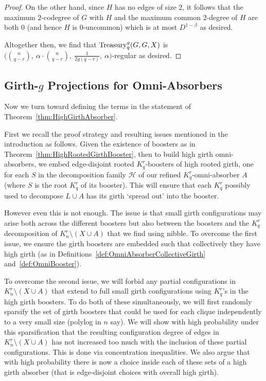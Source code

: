 \documentclass[11pt]{article}
\newcounter{i}
\theoremstyle{plain}
\theoremstyle{plain} %
\theoremstyle{definition}
\begin{document}
\begin{proof}
On the other hand, since $H$ has no edges of size $2$, it follows that the maximum $2$-codegree of $G$ with $H$ and the maximum common $2$-degree of $H$ are both $0$ (and hence $H$ is $0$-uncommon) which is at most $D^{1-\beta}$ as desired.

Altogether then, we find that ${\rm Treasury}_q^g(G,G,X)$ is $\bigg(\binom{n}{q-r},~\alpha\cdot \binom{n}{q-r},~\frac{1}{2g(q-r)},~\alpha\bigg)$-regular as desired.
\end{proof}

\subsection{Girth-$g$ Projections for Omni-Absorbers}\label{ss:OmniProjection}

Now we turn toward defining the terms in the statement of Theorem~\ref{thm:HighGirthAbsorber}.

First we recall the proof strategy and resulting issues mentioned in the introduction as follows. Given the existence of boosters as in Theorem~\ref{thm:HighRootedGirthBooster}, then to build high girth omni-absorbers, we embed edge-disjoint rooted $K_q^r$-boosters of high rooted girth, one for each $S$ in the decomposition family $\mathcal{H}$ of our refined $K_q^r$-omni-absorber $A$ (where $S$ is the root $K_q^r$ of its booster). This will ensure that each $K_q^r$ possibly used to decompose $L\cup A$ has its girth `spread out' into the booster. 

However even this is not enough. The issue is that small girth configurations may arise both across the different boosters but also between the boosters and the $K_q^r$ decomposition of $K_n^r\setminus (X\cup A)$ that we find using nibble. To overcome the first issue, we ensure the girth boosters are embedded such that collectively they have high girth (as in Definitions~\ref{def:OmniAbsorberCollectiveGirth} and~\ref{def:OmniBooster}). 

To overcome the second issue, we will forbid any partial configurations in $K_n^r\setminus (X\cup A)$ that extend to full small girth configurations using $K_q^r$'s in the high girth boosters. To do both of these simultaneously, we will first randomly sparsify the set of girth boosters that could be used for each clique independently to a very small size (polylog in $n$ say). We will show with high probability under this sparsification that the resulting configuration degree of edges in $K_n^r\setminus (X\cup A)$ has not increased too much with the inclusion of these partial configurations. This is done via concentration inequalities. We also argue that with high probability there is now a choice inside each of these sets of a high girth absorber (that is edge-disjoint choices with overall high girth).
\end{document}
